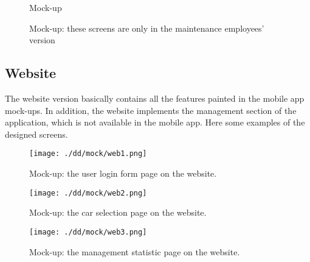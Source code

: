\documentclass{scrreprt}
\begin{document}
\begin{figure}[htb]
\centering
{} \quad
{}
\caption{Mock-up}
\label{fig:keepMU}
\end{figure}

\begin{figure}[htb]
\centering
{} \quad
{}
\caption{Mock-up: these screens are only in the maintenance employees' version}
\label{fig:reglogMU}
\end{figure}

\subsection{Website}
The website version basically contains all the features painted in the mobile app mock-ups. In addition, the website implements the management section of the application, which is not available in the mobile app. Here some examples of the designed screens.

\begin{figure}[htb]
\centering
		\texttt{[image: ./dd/mock/web1.png]}
		\caption{Mock-up: the user login form page on the website.}
		\label{web1MU}
\end{figure}

\begin{figure}[htb]
\centering
		\texttt{[image: ./dd/mock/web2.png]}
		\caption{Mock-up: the car selection page on the website.}
		\label{web2MU}
\end{figure}

\begin{figure}[htb]
\centering
		\texttt{[image: ./dd/mock/web3.png]}
		\caption{Mock-up: the management statistic page on the website.}
		\label{web3MU}
\end{figure}
\end{document}
